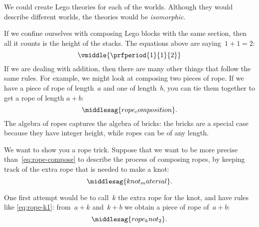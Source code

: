 We could create Lego theories for each of the worlds.
Although they would describe different worlds, the theories would be \emph{isomorphic}.

If we confine ourselves with composing Lego blocks with the same section, then all it counts is the height of the stacks.
The equations above are saying~$1+1=2$:
%
\begin{equation}
	\vmiddle{\prfperiod{1}{1}{2}}
\end{equation}
%
If we are dealing with addition, then there are many other things that follow the same rules.
For example, we might look at composing two pieces of rope.
If we have a piece of rope of length~$a$ and one of length~$b$, you can tie them together to get a rope of length $a+b$:
%
\begin{equation}
	\label{eq:rope-compose}
	\middlesag{rope_composition}.
\end{equation}
%
The algebra of ropes captures the algebra of bricks: the bricks are a special case because they have integer height, while ropes can be of any length.

We want to show you a rope trick.
Suppose that we want to be more precise than~\cref{eq:rope-compose} to describe the process of composing ropes, by keeping track of the extra rope that is needed to make a knot:
%
\begin{equation}
	\label{eq:knot_material}
	\middlesag{knot_material}.
\end{equation}

One first attempt would be to call~$k$ the extra rope for the knot, and have rules like \cref{eq:rope-k1}: from~$a + k$ and~$k + b$ we obtain a piece of rope of~$a+b$:
\begin{equation}
	\label{eq:rope-k1}
	\middlesag{rope_knot_2}.
\end{equation}


